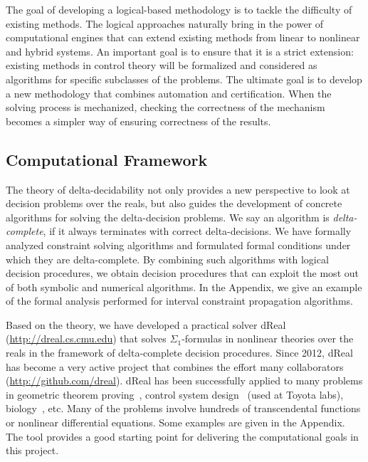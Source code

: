 \documentclass[11pt]{article}
\theoremstyle{definition}
\begin{document}
The goal of developing a logical-based methodology is to tackle the difficulty of existing methods. The logical approaches naturally bring in the power of computational engines that can extend existing methods from linear to nonlinear and hybrid systems. An important goal is to ensure that it is a strict extension: existing methods in control theory will be formalized and considered as algorithms for specific subclasses of the problems. The ultimate goal is to develop a new methodology that combines automation and certification. When the solving process is mechanized, checking the correctness of the mechanism becomes a simpler way of ensuring correctness of the results. 

\subsection{Computational Framework}\label{dreal}

The theory of delta-decidability not only provides a new perspective to look at decision problems over the reals, but also guides the development of concrete algorithms for solving the delta-decision problems. We say an algorithm is {\em delta-complete}, if it always terminates with correct delta-decisions. We have formally analyzed constraint solving algorithms and formulated formal conditions under which they are delta-complete. By combining such algorithms with logical decision procedures, we obtain decision procedures that can exploit the most out of both symbolic and numerical algorithms. In the Appendix, we give an example of the formal analysis performed for interval constraint propagation algorithms. 

Based on the theory, we have developed a practical solver dReal~\cite{DBLP:conf/cade/GaoKC13,DBLP:conf/fmcad/GaoKC13} (\url{http://dreal.cs.cmu.edu}) that solves $\Sigma_1$-formulas in nonlinear theories over the reals in the framework of delta-complete decision procedures. Since 2012, dReal has become a very active project that combines the effort many collaborators (\url{http://github.com/dreal}). dReal has been successfully applied to many problems in geometric theorem proving~\cite{DBLP:conf/cade/GaoKC13}, control system design~\cite{DBLP:conf/fmcad/GaoKC13,DBLP:conf/hybrid/KapinskiDSA14} (used at Toyota labs), biology~\cite{DBLP:conf/fmcad/GaoKC13}, etc. Many of the problems involve hundreds of transcendental functions or nonlinear differential equations. Some examples are given in the Appendix. The tool provides a good starting point for delivering the computational goals in this project.
\end{document}
